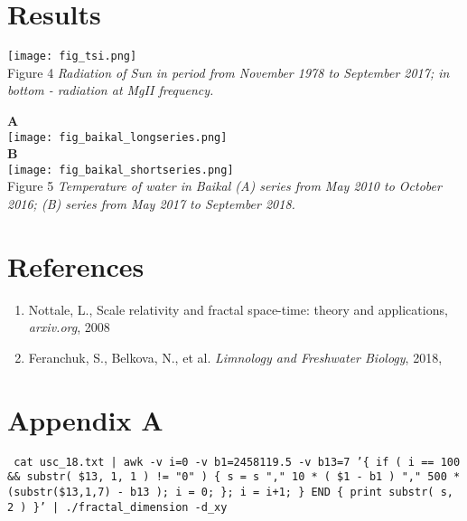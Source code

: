 \documentclass[a4paper]{article}
\begin{document}
\newpage
\section*{Results}

\texttt{[image: fig\_tsi.png]}\\
\vskip 12pt
Figure 4 \textit{Radiation of Sun in period from November 1978 to September 2017; in bottom - radiation at MgII frequency. }

\newpage
{\large{\textbf{A}}}\\
\texttt{[image: fig\_baikal\_longseries.png]}\\
\vskip 12pt
{\large{\textbf{B}}}\\
\texttt{[image: fig\_baikal\_shortseries.png]}\\
\vskip 12pt
Figure 5 \textit{Temperature of water in Baikal (A) series from May 2010 to October 2016; (B) series from May 2017 to September 2018. }

\section*{References}

\begin{enumerate}

\item Nottale, L., Scale relativity and fractal space-time: theory and applications, \textit{arxiv.org}, 2008

\item Feranchuk, S., Belkova, N., et al. \textit{Limnology and Freshwater Biology}, 2018,

\end{enumerate}

\newpage
\section*{Appendix A}


\texttt{\small{ cat usc\_18.txt | awk -v i=0 -v b1=2458119.5 -v b13=7 '\{ if ( i == 100 \&\& substr( \$13, 1, 1 ) != "0" ) \{ s = s "," 10 * ( \$1 - b1 ) "," 500 * (substr(\$13,1,7) - b13 ); i = 0; \}; i = i+1; \} END \{ print substr( s, 2 ) \}' | ./fractal\_dimension -d\_xy }}


\end{document}
